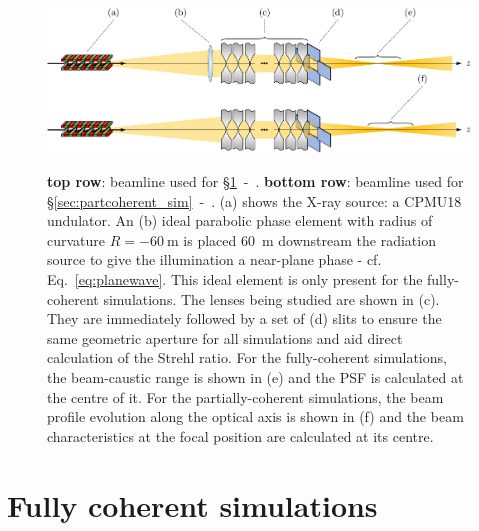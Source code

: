 \begin{refsection}
\begin{figure}[t]
        \centering
        {\includegraphics[width=0.8\linewidth]{figures/ch05/optical_setups.pdf}}
        \caption[Beamlines for coherent- and partially-coherent simulations]{\textbf{top row}: beamline used for  \S\ref{sec:coherent_sim}~-~\textit{}. \textbf{bottom row}: beamline used for  \S\ref{sec:partcoherent_sim}~-~\textit{}. (a) shows the X-ray source: a CPMU18 undulator. An (b) ideal parabolic phase element with radius of curvature $R=-60~$m is placed 60~m downstream the radiation source to give the illumination a near-plane phase - cf. Eq.~\ref{eq:planewave}. This ideal element is only present for the fully-coherent simulations. The lenses being studied are shown in (c). They are immediately followed by a set of (d) slits to ensure the same geometric aperture for all simulations and aid direct calculation of the Strehl ratio. For the fully-coherent simulations, the beam-caustic range is shown in (e) and the PSF is calculated at the centre of it. For the partially-coherent simulations, the beam profile evolution along the optical axis is shown in (f) and the beam characteristics at the focal position are calculated at its centre. 
        }\label{fig:optical_setups}
\end{figure}

\section{Fully coherent simulations}\label{sec:coherent_sim}


\end{refsection}
